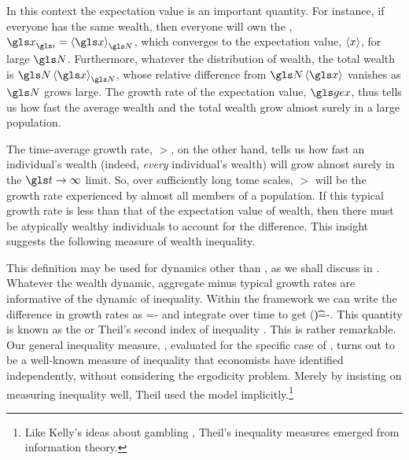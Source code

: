 In this context the expectation value is an important quantity. 
For instance, if everyone has the same wealth, then everyone will own the \FEA, $\x_\gi=\ave{\x}_\N$, which converges to the expectation value, $\left\langle x\right\rangle$, for large $\N$.
Furthermore, whatever the distribution of wealth, the total wealth is $\N\ave{\x}_\N$, whose relative difference from $\N\ave{\x}$ vanishes as $\N$ grows large.
The growth rate of the expectation value, $\gex$, thus tells us how fast the average wealth and the total wealth grow almost surely in a large population.

The time-average growth rate, $\gt$, on the other hand, tells us how fast an individual's wealth (indeed, \textit{every} individual's wealth) will grow almost surely in the $\t\to\infty$ limit.
So, over sufficiently long tome scales, $\gt$ will be the growth rate experienced by almost all members of a population.
If this typical growth rate is less than that of the expectation value of wealth, then there must be atypically wealthy individuals to account for the difference. This insight suggests the following measure of wealth inequality.


This definition may be used for dynamics other than \GBM, as we shall discuss in . Whatever the wealth dynamic, aggregate minus typical growth rates are informative of the dynamic of inequality. Within the \GBM framework we can write the difference in growth rates as 
\be
\frac{\gd \J}{\gd\t}=\frac{\gd \ln \ave{\x}}{\gd\t}-\frac{\gd \ave{\ln \x}}{\gd\t}
\ee
and integrate over time to get
\be
\J(\t)=\ln \ave{\x(\t)}-\ave{\ln \x(\t)}.
\ee
This quantity is known as the \MLD or Theil's second index of inequality \cite{Theil1967}. This is rather remarkable. Our general inequality measure, , evaluated for the specific case of \GBM, turns out to be a well-known measure of inequality that economists have identified independently, without considering the ergodicity problem. Merely by insisting on measuring inequality well, Theil used the \GBM model implicitly.\footnote{Like Kelly's ideas about gambling \cite{Kelly1956}, Theil's inequality measures emerged from information theory.}

